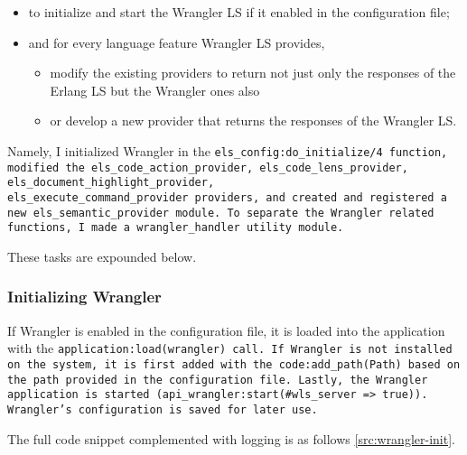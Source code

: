 \begin{itemize}
    \item to initialize and start the Wrangler LS if it enabled in the configuration file;
    \item and for every language feature Wrangler LS provides,
    \begin{itemize}
        \item modify the existing providers to return not just only the responses of the Erlang LS but the Wrangler ones also
        \item or develop a new provider that returns the responses of the Wrangler LS.
    \end{itemize}
\end{itemize}

Namely, I initialized Wrangler in the \tt els\_config:do\_initialize/4\rm\ function, modified the \tt  els\_code\_action\_provider, els\_code\_lens\_provider, els\_document\_highlight\_provider, els\_execute\_command\_provider\rm\ providers, and created and registered a new \tt els\_semantic\_provider\rm\ module. To separate the Wrangler related functions, I made a \tt wrangler\_handler\rm\ utility module.

These tasks are expounded below.

\subsubsection{Initializing Wrangler}

If Wrangler is enabled in the configuration file, it is loaded into the application with the \tt application:load(wrangler)\rm\ call. If Wrangler is not installed on the system, it is first added with the \tt code:add\_path(Path)\rm\ based on the path provided in the configuration file. Lastly, the Wrangler application is started (\tt api\_wrangler:start(\#{wls\_server => true})\rm ). Wrangler's configuration is saved for later use.

The full code snippet complemented with logging is as follows \ref{src:wrangler-init}.

